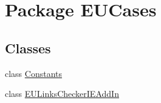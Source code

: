 \hypertarget{namespace_e_u_cases}{\section{Package E\+U\+Cases}
\label{namespace_e_u_cases}
}
\subsection*{Classes}
\begin{DoxyCompactItemize}
\item 
class \hyperlink{class_e_u_cases_1_1_constants}{Constants}
\item 
class \hyperlink{class_e_u_cases_1_1_e_u_links_checker_i_e_add_in}{E\+U\+Links\+Checker\+I\+E\+Add\+In}
\end{DoxyCompactItemize}

